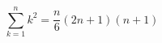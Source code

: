 \documentclass{article}
\begin{document}
\[
	\sum^n_{k=1}k^2=\frac{n}{6}(2n+1)(n+1)
\]
\end{document}
